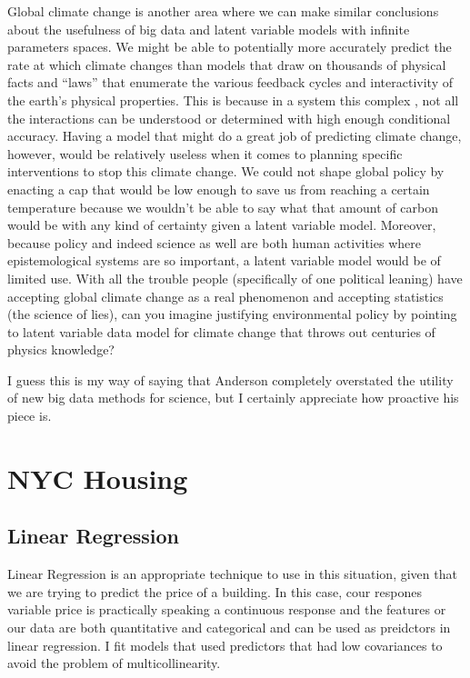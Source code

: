 \documentclass{article}
\begin{document}
Global climate change is another area where we can make similar conclusions about the usefulness of big data and latent variable models with infinite parameters spaces.  We might be able to potentially more accurately predict the rate at which climate changes than models that draw on thousands of physical facts and “laws” that enumerate the various feedback cycles and interactivity of the earth’s physical properties.  This is because in a system this complex , not all the interactions can be understood or determined with high enough conditional accuracy.  Having a model that might do a great job of predicting climate change, however, would be relatively useless when it comes to planning specific interventions to stop this climate change.  We could not shape global policy by enacting a cap that would be low enough to save us from reaching a certain temperature because we wouldn’t be able to say what that amount of carbon would be with any kind of certainty given a latent variable model.  Moreover, because policy and indeed science as well are both human activities where epistemological systems are so important, a latent variable model would be of limited use.  With all the trouble people (specifically of one political leaning) have accepting global climate change as a real phenomenon and accepting statistics (the science of lies), can you imagine justifying environmental policy by pointing to latent variable data model for climate change that throws out centuries of physics knowledge?

I guess this is my way of saying that Anderson completely overstated the utility of new big data methods for science, but I certainly appreciate how proactive his piece is.


\section{NYC Housing}

\subsection{Linear Regression}

Linear Regression is an appropriate technique to use in this situation, given that we are trying to predict the price of a building.  In this case, cour respones variable price is practically speaking a continuous response and the features or our data are both quantitative and categorical and can be used as preidctors in linear regression.  I fit models that used predictors that had low covariances to avoid the problem of multicollinearity. 
\end{document}
